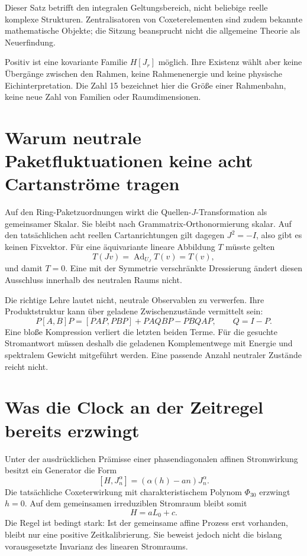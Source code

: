 Dieser Satz betrifft den integralen Geltungsbereich, nicht beliebige reelle komplexe Strukturen. Zentralisatoren von Coxeterelementen sind zudem bekannte mathematische Objekte; die Sitzung beansprucht nicht die allgemeine Theorie als Neuerfindung. \cite{coxeter}

Positiv ist eine kovariante Familie $H[J_r]$ möglich. Ihre Existenz wählt aber keine Übergänge zwischen den Rahmen, keine Rahmenenergie und keine physische Eichinterpretation. Die Zahl 15 bezeichnet hier die Größe einer Rahmenbahn, keine neue Zahl von Familien oder Raumdimensionen.

\section{Warum neutrale Paketfluktuationen keine acht Cartanströme tragen}
Auf den Ring-Paketzuordnungen wirkt die Quellen-$J$-Transformation als gemeinsamer Skalar. Sie bleibt nach Grammatrix-Orthonormierung skalar. Auf den tatsächlichen acht reellen Cartanrichtungen gilt dagegen $J^2=-I$, also gibt es keinen Fixvektor. Für eine äquivariante lineare Abbildung $T$ müsste gelten
\[
 T(Jv)=\operatorname{Ad}_{U_J}T(v)=T(v),
\]
und damit $T=0$. Eine mit der Symmetrie verschränkte Dressierung ändert diesen Ausschluss innerhalb des neutralen Raums nicht. 

Die richtige Lehre lautet nicht, neutrale Observablen zu verwerfen. Ihre Produktstruktur kann über geladene Zwischenzustände vermittelt sein:
\[
 P[A,B]P=[PAP,PBP]+PAQBP-PBQAP,\qquad Q=I-P.
\]
Eine bloße Kompression verliert die letzten beiden Terme. Für die gesuchte Stromantwort müssen deshalb die geladenen Komplementwege mit Energie und spektralem Gewicht mitgeführt werden. Eine passende Anzahl neutraler Zustände reicht nicht.

\section{Was die Clock an der Zeitregel bereits erzwingt}
Unter der ausdrücklichen Prämisse einer phasendiagonalen affinen Stromwirkung besitzt ein Generator die Form
\[
 [H,J_n^\alpha]=(\alpha(h)-an)J_n^\alpha.
\]
Die tatsächliche Coxeterwirkung mit charakteristischem Polynom $\Phi_{30}$ erzwingt $h=0$. Auf dem gemeinsamen irreduziblen Stromraum bleibt somit
\[
 H=aL_0+c.
\]
Die Regel ist bedingt stark: Ist der gemeinsame affine Prozess erst vorhanden, bleibt nur eine positive Zeitkalibrierung. Sie beweist jedoch nicht die bislang vorausgesetzte Invarianz des linearen Stromraums. 

